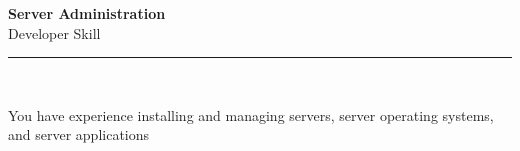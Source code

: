 \documentclass[11pt,a4paper]{memoir}
\begin{document}
    \begin{Spacing}{0.75}%
        \noindent
        \Large
        \textbf{Server Administration}\\[3pt]
        \scriptsize\color{gray}Developer Skill\\ 
        \rule{\textwidth}{.3mm}\\
        
        \vspace{3mm}
        \noindent
        \begin{minipage}[t]{53mm}
            \begin{flushleft}
            {
                \normalsize
                \begin{Spacing}{1}%
                \color{black}\textrm{You have experience installing and managing servers, server operating systems, and server applications}\\
                \end{Spacing}
            }
            \end{flushleft}
        \end{minipage}

        \vspace{5mm}
        \noindent
        \begin{minipage}[t]{53mm}
            \begin{flushleft}
            {
                \normalsize
                \begin{Spacing}{1}%
                \color{gray}\textit{}\\
                \end{Spacing}
            }
            \end{flushleft}
        \end{minipage}
    \end{Spacing}
    \clearpage
\end{document}
